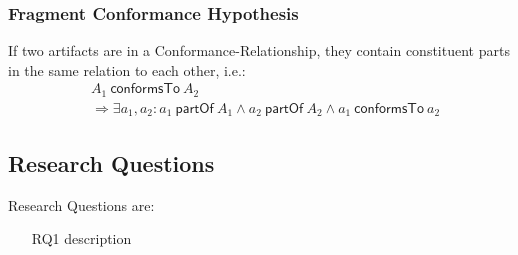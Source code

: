 \documentclass[runningheads,a4paper]{llncs}
\newcommand{\partOf}{~\textsf{partOf}~}
\newcommand{\properPartOf}{~\textsf{properPartOf}~}
\newcommand{\atomOf}{~\textsf{atomOf}~}
\newcommand{\fragmentOf}{~\textsf{fragmentOf}~}
\newcommand{\atomicFragmentOf}{~\textsf{atomicFragmentOf}~}
\newcommand{\correspondsToR}[1]{~\textsf{correspondsTo}_{#1}~}
\newcommand{\conformsTo}{~\textsf{conformsTo}~}
\begin{document}
\subsubsection{Fragment Conformance Hypothesis}
If two artifacts are in a Conformance-Relationship, they contain constituent parts in the same relation to each other, i.e.:
\begin{align*}
&A_1 \conformsTo A_2
\\&\Rightarrow
\exists a_1, a_2: 
a_1 \partOf A_1 
\wedge a_2 \partOf A_2 
\wedge a_1 \conformsTo a_2
\end{align*}

\subsection{Research Questions}
Research Questions are:
\begin{itemize}
\item[RQ1] description
\end{itemize}
\end{document}
